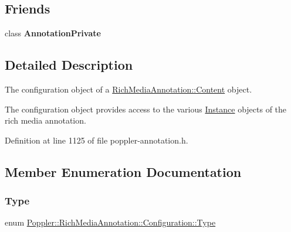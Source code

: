\subsection*{Friends}
\begin{DoxyCompactItemize}
\item 
\mbox{\label{class_poppler_1_1_rich_media_annotation_1_1_configuration_add0bc3e32e560f9e9eb3025587c1ad54}} 
class {\bfseries Annotation\+Private}
\end{DoxyCompactItemize}


\subsection{Detailed Description}
The configuration object of a \hyperlink{class_poppler_1_1_rich_media_annotation_1_1_content}{Rich\+Media\+Annotation\+::\+Content} object.

The configuration object provides access to the various \hyperlink{class_poppler_1_1_rich_media_annotation_1_1_instance}{Instance} objects of the rich media annotation. 

Definition at line 1125 of file poppler-\/annotation.\+h.



\subsection{Member Enumeration Documentation}
\mbox{\label{class_poppler_1_1_rich_media_annotation_1_1_configuration_a1ea5d0aa668b750c50d3c9ae53f31e3b}} 
\subsubsection{\texorpdfstring{Type}{Type}}
{\footnotesize\ttfamily enum \hyperlink{class_poppler_1_1_rich_media_annotation_1_1_configuration_a1ea5d0aa668b750c50d3c9ae53f31e3b}{Poppler\+::\+Rich\+Media\+Annotation\+::\+Configuration\+::\+Type}}

